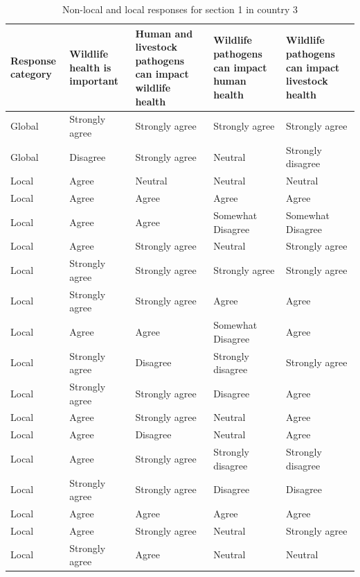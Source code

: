 \documentclass[
  letterpaper,
  DIV=11,
  numbers=noendperiod]{scrartcl}
\begin{document}
\begin{table}[H]

\caption{Non-local and local responses for section 1 in country 3}
\centering
\begin{tabular}[t]{>{\raggedright\arraybackslash}p{2cm}|>{\raggedright\arraybackslash}p{3cm}|>{\raggedright\arraybackslash}p{3cm}|>{\raggedright\arraybackslash}p{3cm}|>{\raggedright\arraybackslash}p{3cm}}
\hline
Response
category & Wildlife health
is important & Human and livestock
pathogens can
impact wildlife
health & Wildlife pathogens can
impact human health & Wildlife pathogens can
impact livestock health\\
\hline
Global & Strongly agree & Strongly agree & Strongly agree & Strongly agree\\
\hline
Global & Disagree & Strongly agree & Neutral & Strongly disagree\\
\hline
Local & Agree & Neutral & Neutral & Neutral\\
\hline
Local & Agree & Agree & Agree & \vphantom{1} Agree\\
\hline
Local & Agree & Agree & Somewhat Disagree & Somewhat Disagree\\
\hline
Local & Agree & Strongly agree & Neutral & Strongly \vphantom{1} agree\\
\hline
Local & Strongly agree & Strongly agree & Strongly agree & Strongly \vphantom{2} agree\\
\hline
Local & Strongly agree & Strongly agree & Agree & Agree\\
\hline
Local & Agree & Agree & Somewhat Disagree & Agree\\
\hline
Local & Strongly agree & Disagree & Strongly disagree & Strongly agree\\
\hline
Local & Strongly agree & Strongly agree & Disagree & Agree\\
\hline
Local & Agree & Strongly agree & Neutral & Agree\\
\hline
Local & Agree & Disagree & Neutral & Agree\\
\hline
Local & Agree & Strongly agree & Strongly disagree & Strongly disagree\\
\hline
Local & Strongly agree & Strongly agree & Disagree & Disagree\\
\hline
Local & Agree & Agree & Agree & Agree\\
\hline
Local & Agree & Strongly agree & Neutral & Strongly agree\\
\hline
Local & Strongly agree & Agree & Neutral & \vphantom{1} Neutral\\

\end{tabular}
\end{table}
\end{document}
